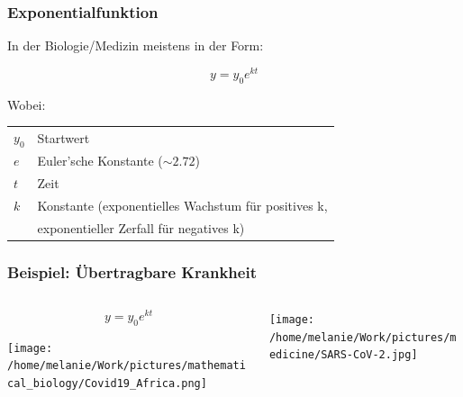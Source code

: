 \documentclass{beamer}
\begin{document}
\begin{frame}
\frametitle{Exponentialfunktion}

 In der Biologie/Medizin meistens in der Form:

\[
y = y_0 e^{kt}
\]

Wobei:

\begin{tabular}{ll}
\(y_0\) & Startwert \\
\(e\)   & Euler'sche Konstante (\(\sim 2.72\))  \\
\(t\)   & Zeit \\
\(k\)   & Konstante (exponentielles Wachstum für positives k, \\
        & exponentieller Zerfall für negatives k) \\
\end{tabular}


\end{frame}


\begin{frame}
\frametitle{Beispiel: Übertragbare Krankheit}

\begin{columns}[c]
\begin{column}{5cm}

\[
y = y_0 e^{kt}
\] 


\begin{center}

\texttt{[image: /home/melanie/Work/pictures/mathematical\_biology/Covid19\_Africa.png]}
\end{center}



\end{column}
\begin{column}{5cm}

\begin{center}
\texttt{[image: /home/melanie/Work/pictures/medicine/SARS-CoV-2.jpg]}
\end{center}


\end{column}
\end{columns}


\end{frame}
\end{document}
